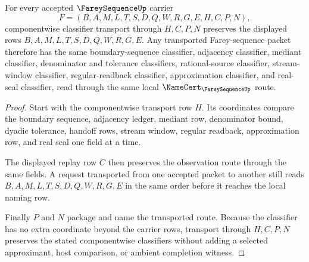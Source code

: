 \begin{theorem}
\label{thm:farey-sequence-classifier-transport}
For every accepted $\FareySequenceUp$ carrier
$$
F=(B,A,M,L,T,S,D,Q,W,R,G,E,H,C,P,N),
$$
componentwise classifier transport through $H,C,P,N$ preserves the displayed rows $B,A,M,L,T,S,D,Q,W,R,G,E$. Any transported Farey-sequence packet therefore has the same boundary-sequence classifier, adjacency classifier, mediant classifier, denominator and tolerance classifiers, rational-source classifier, stream-window classifier, regular-readback classifier, approximation classifier, and real-seal classifier, read through the same local $\NameCert_{\FareySequenceUp}$ route.
\end{theorem}
\begin{proof}
Start with the componentwise transport row $H$. Its coordinates compare the boundary sequence, adjacency ledger, mediant row, denominator bound, dyadic tolerance, handoff rows, stream window, regular readback, approximation row, and real seal one field at a time.

The displayed replay row $C$ then preserves the observation route through the same fields. A request transported from one accepted packet to another still reads $B,A,M,L,T,S,D,Q,W,R,G,E$ in the same order before it reaches the local naming row.

Finally $P$ and $N$ package and name the transported route. Because the classifier has no extra coordinate beyond the carrier rows, transport through $H,C,P,N$ preserves the stated componentwise classifiers without adding a selected approximant, host comparison, or ambient completion witness.
\end{proof}

